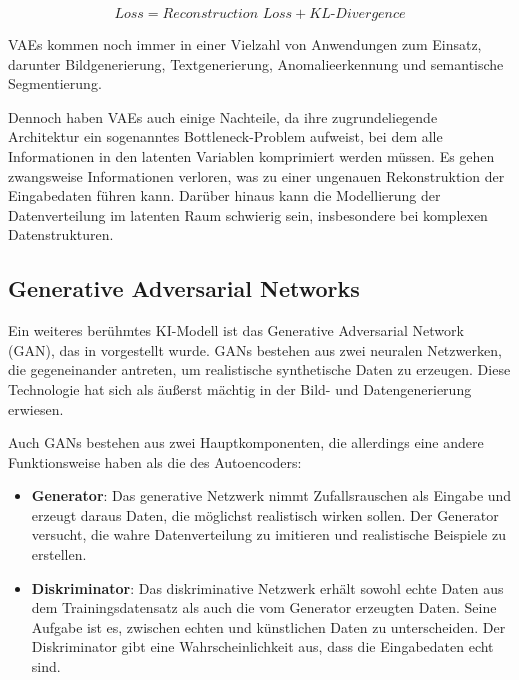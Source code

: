 \begin{equation}
	Loss = \textit{Reconstruction Loss} + \textit{KL-Divergence}
	\label{eq:loss-vae}
\end{equation}

VAEs kommen noch immer in einer Vielzahl von Anwendungen zum Einsatz, darunter Bildgenerierung, Textgenerierung, Anomalieerkennung und semantische Segmentierung. \parencite{}

Dennoch haben VAEs auch einige Nachteile, da ihre zugrundeliegende Architektur ein sogenanntes Bottleneck-Problem aufweist, bei dem alle Informationen in den latenten Variablen komprimiert werden müssen. Es gehen zwangsweise Informationen verloren, was zu einer ungenauen Rekonstruktion der Eingabedaten führen kann. Darüber hinaus kann die Modellierung der Datenverteilung im latenten Raum schwierig sein, insbesondere bei komplexen Datenstrukturen. \parencite{}

\subsection{Generative Adversarial Networks} \label{sec:gan}

Ein weiteres berühmtes KI-Modell ist das Generative Adversarial Network (GAN), das in \parencite{Goodfellow2014gan} vorgestellt wurde. GANs bestehen aus zwei neuralen Netzwerken, die gegeneinander antreten, um realistische synthetische Daten zu erzeugen. Diese Technologie hat sich als äußerst mächtig in der Bild- und Datengenerierung erwiesen.

Auch GANs bestehen aus zwei Hauptkomponenten, die allerdings eine andere Funktionsweise haben als die des Autoencoders:

\begin{itemize}
	\item \textbf{Generator}: Das generative Netzwerk nimmt Zufallsrauschen als Eingabe und erzeugt daraus Daten, die möglichst realistisch wirken sollen. Der Generator versucht, die wahre Datenverteilung zu imitieren und realistische Beispiele zu erstellen.
	\item \textbf{Diskriminator}: Das diskriminative Netzwerk erhält sowohl echte Daten aus dem Trainingsdatensatz als auch die vom Generator erzeugten Daten. Seine Aufgabe ist es, zwischen echten und künstlichen Daten zu unterscheiden. Der Diskriminator gibt eine Wahrscheinlichkeit aus, dass die Eingabedaten echt sind.
\end{itemize}

